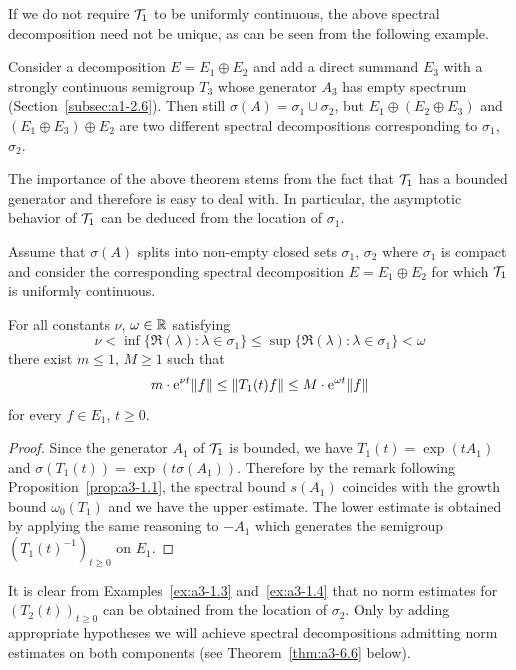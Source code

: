 \begin{example*}
If we do not require $\mathcal{T}_{1}$ to be uniformly continuous, the above spectral decomposition need not be unique, as can be seen from the following example. 

Consider a decomposition $E = E_{1} \oplus E_{2}$ and add a direct summand $E_{3}$ with a strongly continuous semigroup $T_{3}$ whose generator $A_{3}$ has empty spectrum (\eg Section~\ref{subsec:a1-2.6}).
Then still $\sigma(A) = \sigma_{1} \cup \sigma_{2}$, but $E_{1} \oplus (E_{2} \oplus E_{3})$ and $(E_{1} \oplus E_{3}) \oplus E_{2}$ are two different spectral decompositions corresponding to $\sigma_{1}$, $\sigma_{2}$.
\end{example*}
The importance of the above theorem stems from the fact that $\mathcal{T}_{1}$ has a bounded generator and therefore is easy to deal with.
In particular, the asymptotic behavior of\/ $\mathcal{T}_{1}$ can be deduced from the location of\/ $\sigma_{1}$.
\begin{corollary}\label{cor:a3-3.4}
Assume that $\sigma(A)$ splits into non-empty closed sets $\sigma_{1}$, $\sigma_{2}$ where $\sigma_{1}$ is compact and consider the corresponding spectral decomposition $E = E_{1} \oplus E_{2}$ for which $\mathcal{T}_{1}$ is uniformly continuous.

For all constants $\nu$, $\omega \in \mathbb{R}$ satisfying
\[
\nu < \inf \{\Re(\lambda) \colon \lambda \in \sigma_{1}\} \leq \sup \{\Re(\lambda) \colon \lambda \in \sigma_{1}\} < \omega
\]
there exist $m \leq 1$, $M \geq 1$ such that
\[
m \cdot \eu^{\nu t}\|f\| \leq \|T_{1}(t)f\| \leq M \cdot \eu^{\omega t}\|f\|
\]
for every $f \in E_{1}$, $t \geq 0$.
\end{corollary}
\begin{proof}
Since the generator $A_{1}$ of\/ $\mathcal{T}_{1}$ is bounded, we have $T_{1}(t) = \exp(tA_{1})$ and $\sigma(T_{1}(t)) = \exp(t\sigma(A_{1}))$.
Therefore by the remark following Proposition~\ref{prop:a3-1.1}, the spectral bound $s(A_{1})$ coincides with the growth bound $\omega_{0}(T_{1})$ and we have the upper estimate.
The lower estimate is obtained by applying the same reasoning to $-A_{1}$ which generates the semigroup $(T_{1}(t)^{-1})_{t \geq 0}$ on $E_{1}$.
\end{proof}
It is clear from Examples~\ref{ex:a3-1.3} and~\ref{ex:a3-1.4} that no norm estimates for $(T_{2}(t))_{t \geq 0}$ can be obtained from the location of\/ $\sigma_{2}$.
Only by adding appropriate hypotheses we will achieve spectral decompositions admitting norm estimates on both components (see Theorem~\ref{thm:a3-6.6} below).

